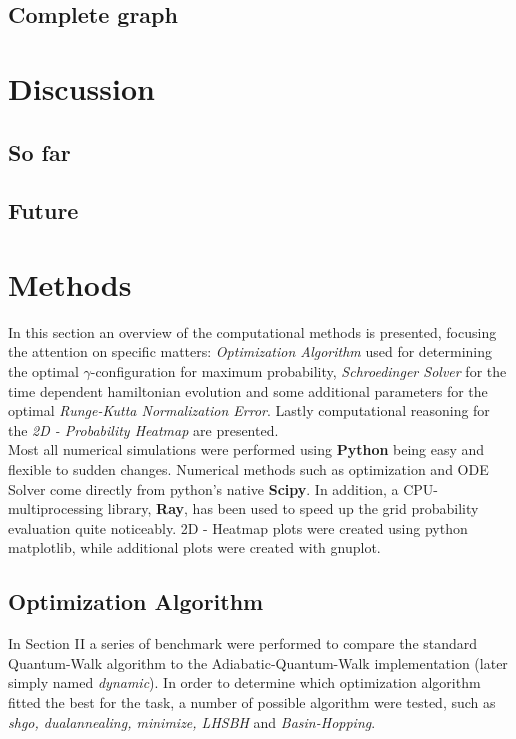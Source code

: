 \documentclass[aps,pra,reprint, onecolumn]{revtex4-2}
\begin{document}
\subsection{Complete graph}


\section{Discussion}
\subsection{So far}
\subsection{Future}


\section{Methods}
In this section an overview of the computational methods is presented, focusing the attention on specific matters: \textit{Optimization Algorithm} used for determining the optimal $\gamma$-configuration for maximum probability, \textit{Schroedinger Solver} for the time dependent hamiltonian evolution and some additional parameters for the optimal \textit{Runge-Kutta Normalization Error}. Lastly computational reasoning for the \textit{2D - Probability Heatmap} are presented. \\

Most all numerical simulations were performed using \textbf{Python} being easy and flexible to sudden changes. Numerical methods such as optimization and ODE Solver come directly from python's native \textbf{Scipy}. In addition, a CPU-multiprocessing library, \textbf{Ray}, has been used to speed up the grid probability evaluation quite noticeably. 2D - Heatmap plots were created using python matplotlib, while additional plots were created with gnuplot.

\subsection{Optimization Algorithm}
In Section II a series of benchmark were performed to compare the standard Quantum-Walk algorithm to the Adiabatic-Quantum-Walk implementation (later simply named \textit{dynamic}). In order to determine which optimization algorithm fitted the best for the task, a number of possible algorithm were tested, such as \textit{shgo, dualannealing, minimize, LHSBH} and \textit{Basin-Hopping}. \\
\end{document}
